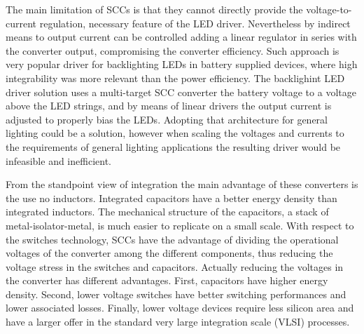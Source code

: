 The main limitation of SCCs is that they cannot directly  provide the voltage-to-current regulation, necessary feature of the LED driver. Nevertheless by indirect means to output current can be controlled adding a linear regulator in series with the converter output, compromising the converter efficiency.  Such approach is very popular driver for backlighting LEDs in battery supplied devices, where high  integrability was more relevant than the power efficiency. The backlighint LED driver solution uses a multi-target SCC converter the battery voltage to a voltage above the LED strings, and by means of  linear drivers the output current is adjusted to properly bias the LEDs. Adopting that architecture for general lighting could be a solution, however when scaling the voltages and currents to the requirements of general lighting applications the resulting driver would be infeasible and inefficient.

From the standpoint view of integration the main advantage of these converters is the use no inductors. Integrated capacitors have a better energy density than integrated inductors. The mechanical structure of the capacitors, a stack of metal-isolator-metal, is much easier to replicate on a small scale. With respect to the switches technology, SCCs have the advantage of dividing the operational voltages of  the converter among the different components, thus reducing the voltage stress in the switches and capacitors. Actually reducing the voltages in the converter has different advantages. First,  capacitors have higher energy density. Second, lower voltage switches have better switching performances and lower associated losses. Finally, lower voltage devices require less silicon area and have a larger offer in the standard very large integration scale (VLSI) processes.



